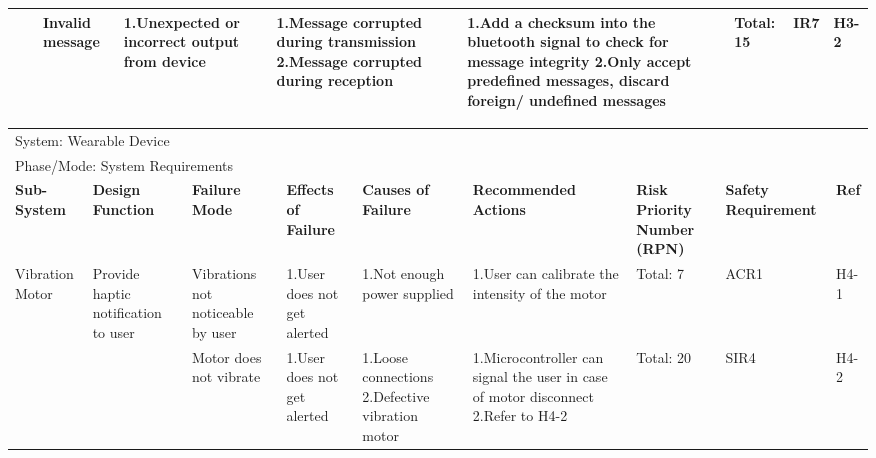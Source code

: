\documentclass{article}
\begin{document}
\begin{landscape}
\begin{table}[H]
\begin{tabular}{| p{} | p{}  | p{} | p{} | p{} | p{} | p{} | p{} | p{} |}
         & & Invalid message & 1.Unexpected or incorrect output from device & 1.Message corrupted during transmission \newline 2.Message corrupted during reception & 1.Add a checksum into the bluetooth signal to check for message integrity \newline 2.Only accept predefined messages, discard foreign/ undefined messages & Total: 15 & IR7 & H3-2 \\ \hline
    
        \end{tabular}
        \hspace*{-1cm}
\end{table}

\begin{table}[H]
    \centering
        
        \begin{tabular}{| p{} | p{}  | p{} | p{} | p{} | p{} | p{} | p{} | p{} |}
        \hline
        
        \multicolumn{9}{|l|}{System: Wearable Device} \\
        \multicolumn{9}{|l|}{Phase/Mode: System Requirements} \\ \hline
        \textbf{Sub-System} & \textbf{Design Function} & \textbf{Failure Mode} & \textbf{Effects of Failure} & \textbf{Causes of Failure} & \textbf{Recommended Actions} & \textbf{Risk Priority Number (RPN)} & \textbf{Safety Requirement} & \textbf{Ref} \\ \hline

         Vibration Motor & Provide haptic notification to user & Vibrations not noticeable by user & 1.User does not get alerted & 1.Not enough power supplied & 1.User can calibrate the intensity of the motor & Total: 7 & ACR1 & H4-1 \\ \cline{3-9}
    
         & & Motor does not vibrate & 1.User does not get alerted & 1.Loose connections \newline 2.Defective vibration motor  & 1.Microcontroller can signal the user in case of motor disconnect \newline 2.Refer to  H4-2  & Total: 20 & SIR4 & H4-2 \\ \cline{3-9}
     

\end{tabular}
\end{table}
\end{landscape}
\end{document}
